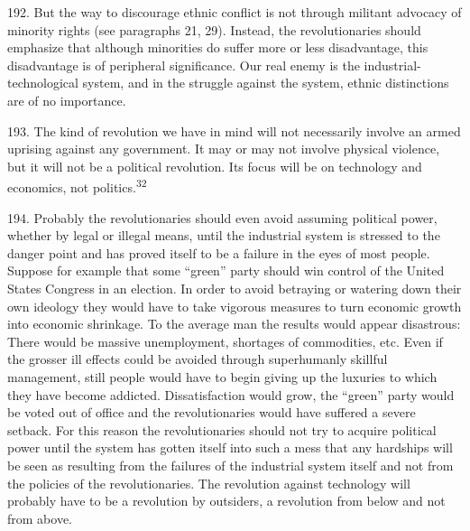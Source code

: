 \documentclass{article}
\begin{document}
192.  But the way to discourage ethnic conflict is not through militant advocacy of minority rights 
(see paragraphs 21, 29).  Instead, the revolutionaries should emphasize that although minorities do 
suffer more or less disadvantage, this disadvantage is of peripheral significance.  Our real enemy 
is the industrial-technological system, and in the struggle against the system, ethnic distinctions 
are of no importance. \vspace{\baselineskip}

193.  The  kind  of  revolution  we  have  in  mind  will  not  necessarily  involve  an  armed  uprising  
against any government.  It may or may not involve physical violence, but it will not be a political 
revolution.  Its focus will be on technology and economics, not politics.\textsuperscript{32} \vspace{\baselineskip}

194.  Probably the revolutionaries should even avoid assuming political power, whether by legal 
or illegal means, until the industrial system is stressed to the danger point and has proved itself to 
be a failure in the eyes of most people.  Suppose for example that some “green” party should win 
control of the United States Congress in an election.  In order to avoid betraying or watering down 
their  own  ideology  they  would  have  to  take  vigorous  measures  to  turn  economic  growth  into
economic  shrinkage.   To  the  average  man  the  results  would  appear  disastrous:  There  would  be  
massive  unemployment,  shortages  of  commodities,  etc.   Even  if  the  grosser  ill  effects  could  be  
avoided through superhumanly skillful management, still people would have to begin giving up 
the luxuries to which they have become addicted.  Dissatisfaction would grow, the “green” party 
would be voted out of office and the revolutionaries would have suffered a severe setback.  For 
this reason the revolutionaries should not try to acquire political power until the system has gotten 
itself into such a mess that any hardships will be seen as resulting from the failures of the industrial 
system itself and not from the policies of the revolutionaries.  The revolution against technology 
will probably have to be a revolution by outsiders, a revolution from below and not from above. \vspace{\baselineskip}
\end{document}
